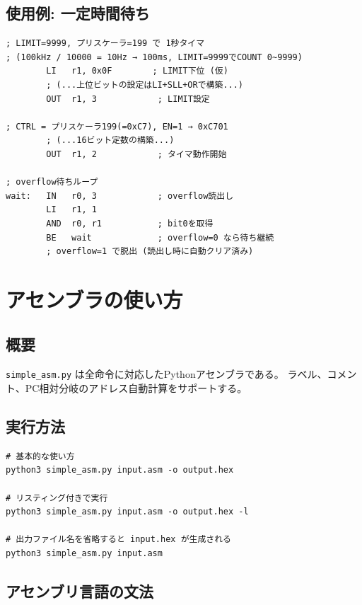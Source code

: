 \documentclass[a4paper,11pt]{ltjsarticle}
\begin{document}
\subsection{使用例: 一定時間待ち}

\begin{lstlisting}[language={},caption={タイマによる一定時間待ち}]
; LIMIT=9999, プリスケーラ=199 で 1秒タイマ
; (100kHz / 10000 = 10Hz → 100ms, LIMIT=9999でCOUNT 0~9999)
        LI   r1, 0x0F        ; LIMIT下位 (仮)
        ; (...上位ビットの設定はLI+SLL+ORで構築...)
        OUT  r1, 3            ; LIMIT設定

; CTRL = プリスケーラ199(=0xC7), EN=1 → 0xC701
        ; (...16ビット定数の構築...)
        OUT  r1, 2            ; タイマ動作開始

; overflow待ちループ
wait:   IN   r0, 3            ; overflow読出し
        LI   r1, 1
        AND  r0, r1           ; bit0を取得
        BE   wait             ; overflow=0 なら待ち継続
        ; overflow=1 で脱出 (読出し時に自動クリア済み)
\end{lstlisting}


\section{アセンブラの使い方}

\subsection{概要}

\texttt{simple\_asm.py} は全命令に対応したPythonアセンブラである。
ラベル、コメント、PC相対分岐のアドレス自動計算をサポートする。

\subsection{実行方法}

\begin{lstlisting}[language={},caption={アセンブラの実行}]
# 基本的な使い方
python3 simple_asm.py input.asm -o output.hex

# リスティング付きで実行
python3 simple_asm.py input.asm -o output.hex -l

# 出力ファイル名を省略すると input.hex が生成される
python3 simple_asm.py input.asm
\end{lstlisting}

\subsection{アセンブリ言語の文法}
\end{document}
